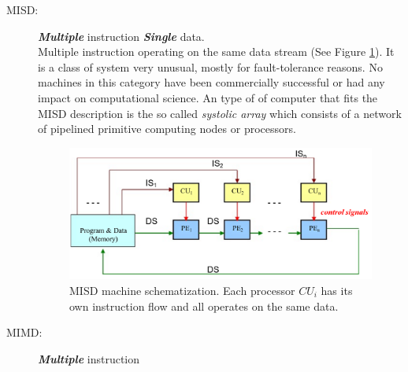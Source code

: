 \begin{description}
\item[MISD:] \textit{\textbf{Multiple}} instruction \textit{\textbf{Single}} data. \hfill \\ 
Multiple instruction operating on the same data stream  (See Figure \ref{fig:MISD}). It is a class of system very unusual, mostly for fault-tolerance reasons. No machines in this category have been commercially successful or had any impact on computational science. 
An type of of computer  that fits the MISD description is the so called \textit{systolic array} which consists of a network of pipelined primitive computing nodes or processors. 
\begin{figure}
	\centering
	\includegraphics[scale=0.30]{./images/parallel_programming/MISD}
	\caption{MISD machine schematization. Each processor $CU_i$ has its own instruction flow and all operates on the same data.}
	\label{fig:MISD}
\end{figure}
 
\item[MIMD:] \textit{\textbf{Multiple}} instruction


\end{description}
